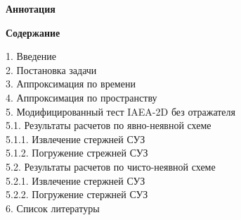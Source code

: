 {	\setcounter{page}{2}	
	\cleardoublepage

	\begin{center}
	\begin{Large}
		\textbf{Аннотация} 	
	\end{Large}
	\end{center}

	\theabstract

	\vfill
	\pagebreak
	\begin{center}
	\begin{Large}
	\textbf{Содержание}	
	\end{Large}
	\end{center}
	\vspace{10mm}
	1. Введение  \\
	2. Постановка задачи  \\	
	3. Аппроксимация по времени  \\	
	4. Аппроксимация по пространству  \\
	5. Модифицированный тест IAEA-2D без отражателя  \\
	\phantom{1234}  5.1. Результаты расчетов по явно-неявной схеме  \\
	\phantom{12345678} 5.1.1. Извлечение стержней СУЗ  \\
	\phantom{12345678} 5.1.2. Погружение стрежней СУЗ  \\
	\phantom{1234} 5.2. Результаты расчетов по чисто-неявной схеме  \\
	\phantom{12345678} 5.2.1. Извлечение стержней СУЗ  \\
	\phantom{12345678} 5.2.2. Погружение стержней СУЗ  \\
	6. Список литературы 
			
	\vfill	
}

 
\usepackage{tikz}
\usetikzlibrary{er}
\usetikzlibrary{shapes,arrows}